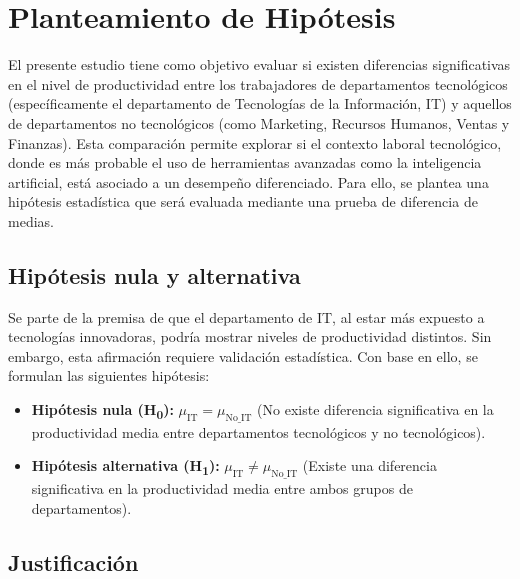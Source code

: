 \section{Planteamiento de Hipótesis}

El presente estudio tiene como objetivo evaluar si existen diferencias significativas en el nivel de productividad entre los trabajadores de departamentos tecnológicos (específicamente el departamento de Tecnologías de la Información, IT) y aquellos de departamentos no tecnológicos (como Marketing, Recursos Humanos, Ventas y Finanzas). Esta comparación permite explorar si el contexto laboral tecnológico, donde es más probable el uso de herramientas avanzadas como la inteligencia artificial, está asociado a un desempeño diferenciado. Para ello, se plantea una hipótesis estadística que será evaluada mediante una prueba de diferencia de medias.

  \subsection*{Hipótesis nula y alternativa}

  Se parte de la premisa de que el departamento de IT, al estar más expuesto a tecnologías innovadoras, podría mostrar niveles de productividad distintos. Sin embargo, esta afirmación requiere validación estadística. Con base en ello, se formulan las siguientes hipótesis:

  \begin{itemize}
    \item \textbf{Hipótesis nula (H\textsubscript{0}):} $\mu_{\text{IT}} = \mu_{\text{No\_IT}}$ (No existe diferencia significativa en la productividad media entre departamentos tecnológicos y no tecnológicos).
    \item \textbf{Hipótesis alternativa (H\textsubscript{1}):} $\mu_{\text{IT}} \neq \mu_{\text{No\_IT}}$ (Existe una diferencia significativa en la productividad media entre ambos grupos de departamentos).
  \end{itemize}

  \subsection*{Justificación}

